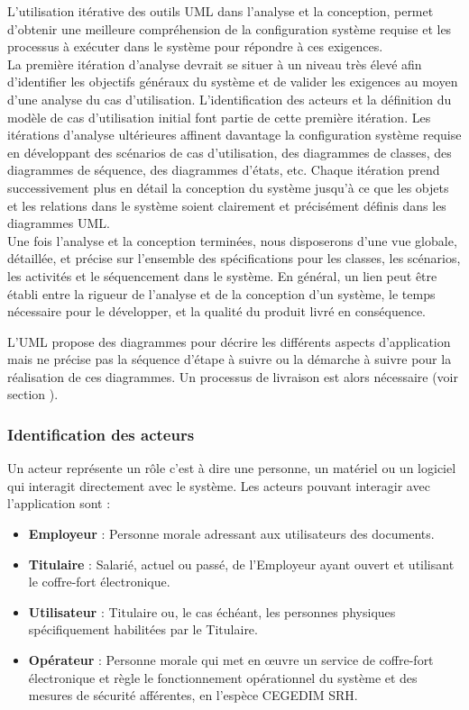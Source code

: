 L’utilisation itérative des outils UML dans l’analyse et la conception, permet d’obtenir une meilleure compréhension de la configuration système requise et les processus à exécuter dans le système pour répondre à ces exigences.\\
La première itération d’analyse devrait se situer à un niveau très élevé afin d’identifier
les objectifs généraux du système et de valider les exigences au moyen d’une analyse du
cas d’utilisation. L’identification des acteurs et la définition du modèle de cas d’utilisation
initial font partie de cette première itération. Les itérations d’analyse ultérieures affinent
davantage la configuration système requise en développant des scénarios de cas d’utilisation, des diagrammes de classes, des diagrammes de séquence, des diagrammes d’états, etc. Chaque itération prend successivement plus en détail la conception du système jusqu’à ce que les objets et les relations dans le système soient clairement et précisément définis dans les diagrammes UML.\\

Une fois l’analyse et la conception terminées, nous disposerons d’une vue globale,
détaillée, et précise sur l’ensemble des spécifications pour les classes, les scénarios, les
activités et le séquencement dans le système. En général, un lien peut être établi entre
la rigueur de l’analyse et de la conception d’un système, le temps nécessaire pour le
développer, et la qualité du produit livré en conséquence.\\
\begin{beware}[title=Conclusion : ]
L’UML propose des diagrammes pour décrire les différents aspects d’application mais
ne précise pas la séquence d’étape à suivre ou la démarche à suivre pour la réalisation de
ces diagrammes. Un processus de livraison est alors nécessaire (voir section ).
\end{beware}

\subsubsection{Identification des acteurs}
Un acteur représente un rôle c’est à dire une personne, un matériel ou un logiciel qui
interagit directement avec le système. Les acteurs pouvant interagir avec l’application
sont :
\begin{itemize}
    \item \textbf{Employeur} : Personne morale adressant aux utilisateurs des documents.
    \item \textbf{Titulaire} : Salarié, actuel ou passé, de l’Employeur ayant ouvert et utilisant le coffre-fort électronique.
    \item \textbf{Utilisateur} : Titulaire ou, le cas échéant, les personnes physiques spécifiquement habilitées par le Titulaire.
    \item \textbf{Opérateur} : Personne morale qui met en œuvre un service de coffre-fort électronique et règle le fonctionnement opérationnel du système et des mesures de sécurité afférentes, en l’espèce CEGEDIM SRH. 
\end{itemize}

